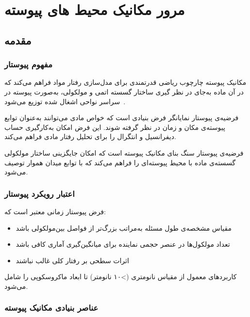 \chapter{مرور مکانیک محیط های پیوسته}

\section{مقدمه‌}

\subsection{مفهوم پیوستار}

مکانیک پیوسته چارچوب ریاضی قدرتمندی برای مدل‌سازی رفتار مواد فراهم می‌کند که در آن ماده به‌جای در نظر گیری ساختار گسسته اتمی و مولکولی، به‌صورت پیوسته در سراسر نواحی اشغال شده توزیع می‌شود~\autocite{Abeyaratne.1987}.

فرضیه‌ی پیوستار نمایانگر فرض بنیادی است که خواص مادی می‌توانند به‌عنوان توابع پیوسته‌ی مکان و زمان در نظر گرفته شوند. این فرض امکان به‌کارگیری حساب دیفرانسیل و انتگرال را برای تحلیل رفتار مادی فراهم می‌کند.

\begin{keypoint}
	فرضیه‌ی پیوستار سنگ بنای مکانیک پیوسته است که امکان جایگزینی ساختار مولکولی گسسته‌ی ماده با محیط پیوسته‌ای را فراهم می‌کند که با توابع میدان هموار توصیف می‌شود.
\end{keypoint}

\subsection{اعتبار رویکرد پیوستار}

فرض پیوستار زمانی معتبر است که:
\begin{itemize}
	\item مقیاس مشخصه‌ی طول مسئله به‌مراتب بزرگ‌تر از فواصل بین‌مولکولی باشد
	\item تعداد مولکول‌ها در عنصر حجمی نماینده برای میانگین‌گیری آماری کافی باشد
	\item اثرات سطحی بر رفتار کلی غالب نباشند
\end{itemize}

کاربردهای معمول از مقیاس نانومتری (>۱۰ نانومتر) تا ابعاد ماکروسکوپی را شامل می‌شود.

\subsection{عناصر بنیادی مکانیک پیوسته}

